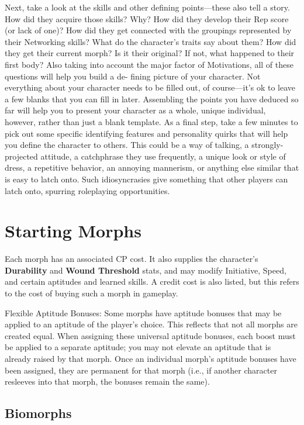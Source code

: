 Next, take a look at the skills and other defining points—these also tell a story. How did they acquire those skills? Why? How did they develop their Rep score (or lack of one)? How did they get connected with the groupings represented by their Networking skills? What do the character’s traits say about them? How did they get their current morph? Is it their original? If not, what happened to their first body? Also taking into account the major factor of Motivations, all of these questions will help you build a de- fining picture of your character. Not everything about your character needs to be filled out, of course—it’s ok to leave a few blanks that you can fill in later. Assembling the points you have deduced so far will help you to present your character as a whole, unique individual, however, rather than just a blank template. As a final step, take a few minutes to pick out some specific identifying features and personality quirks that will help you define the character to others. This could be a way of talking, a strongly-projected attitude, a catchphrase they use frequently, a unique look or style of dress, a repetitive behavior, an annoying mannerism, or anything else similar that is easy to latch onto. Such idiosyncrasies give something that other players can latch onto, spurring roleplaying opportunities.

\section{Starting Morphs}

Each morph has an associated CP cost. It also supplies the character’s \textbf{Durability} and \textbf{Wound Threshold} stats, and may modify Initiative, Speed, and certain aptitudes and learned skills. A credit cost is also listed, but this refers to the cost of buying such a morph in gameplay.

Flexible Aptitude Bonuses: Some morphs have aptitude bonuses that may be applied to an aptitude of the player’s choice. This reflects that not all morphs are created equal. When assigning these universal aptitude bonuses, each boost must be applied to a separate aptitude; you may not elevate an aptitude that is already raised by that morph. Once an individual morph’s aptitude bonuses have been assigned, they are permanent for that morph (i.e., if another character resleeves into that morph, the bonuses remain the same).

\subsection{Biomorphs}
\label{sec:starting-biomorphs}

